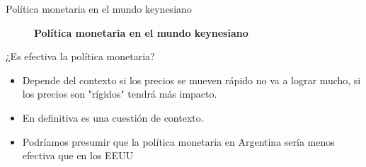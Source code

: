 \documentclass{beamer}
\begin{document}
\begin{frame}{Política monetaria en el mundo keynesiano}
\begin{center}
\begin{figure}[H]
\begin{center}
\begin{minipage}[b]{0.45\textwidth}
\begin{center}
\end{center}
    \end{minipage}
\end{center}
\vspace{0.7cm}
\caption{\textbf{Política monetaria en el mundo keynesiano}}
\label{fig:C35.5}
\end{figure}
\end{center}   
\end{frame}






  



\begin{frame}{¿Es efectiva la política monetaria?}

    \begin{itemize}
        \item Depende del contexto si los precios se mueven rápido no va a lograr mucho, si los precios son "rígidos" tendrá más impacto. 
        \item En definitiva es una cuestión de contexto.
        \item Podríamos presumir que la política monetaria en Argentina sería menos efectiva que en los EEUU

    \end{itemize}
    
\end{frame}
\end{document}
